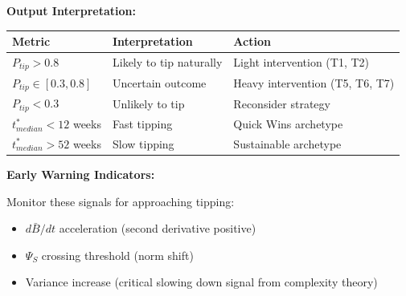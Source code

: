 \begin{tcolorbox}[colback=green!5!white, colframe=green!75!black,
    title=\textbf{Application UNTCM-E2: Tipping Point Prediction}]
\textbf{Output Interpretation:}
\begin{center}
\renewcommand{\arraystretch}{1.2}
\begin{tabular}{@{}lll@{}}
\toprule
\textbf{Metric} & \textbf{Interpretation} & \textbf{Action} \\
\midrule
$P_{tip} > 0.8$ & Likely to tip naturally & Light intervention (T1, T2) \\
$P_{tip} \in [0.3, 0.8]$ & Uncertain outcome & Heavy intervention (T5, T6, T7) \\
$P_{tip} < 0.3$ & Unlikely to tip & Reconsider strategy \\
$t^*_{median} < 12$ weeks & Fast tipping & Quick Wins archetype \\
$t^*_{median} > 52$ weeks & Slow tipping & Sustainable archetype \\
\bottomrule
\end{tabular}
\end{center}

\textbf{Early Warning Indicators:}

Monitor these signals for approaching tipping:
\begin{itemize}[nosep]
\item $d\bar{B}/dt$ acceleration (second derivative positive)
\item $\Psi_S$ crossing threshold (norm shift)
\item Variance increase (critical slowing down signal from complexity theory)
\end{itemize}

\end{tcolorbox}

